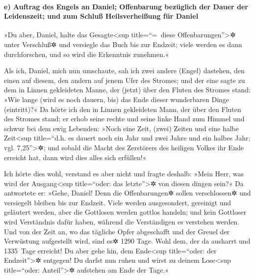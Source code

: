 \hypertarget{e-auftrag-des-engels-an-daniel-offenbarung-bezuxfcglich-der-dauer-der-leidenszeit-und-zum-schluuxdf-heilsverheiuxdfung-fuxfcr-daniel}{%
\paragraph{e) Auftrag des Engels an Daniel; Offenbarung bezüglich der
Dauer der Leidenszeit; und zum Schluß Heilsverheißung für
Daniel}\label{e-auftrag-des-engels-an-daniel-offenbarung-bezuxfcglich-der-dauer-der-leidenszeit-und-zum-schluuxdf-heilsverheiuxdfung-fuxfcr-daniel}}

»Du aber, Daniel, halte das Gesagte\textless sup
title=``=~diese Offenbarungen''\textgreater✲ unter Verschluß✲ und
versiegle das Buch bis zur Endzeit; viele werden es dann durchforschen,
und so wird die Erkenntnis zunehmen.«

Als ich, Daniel, mich nun umschaute, sah ich zwei andere
(Engel) dastehen, den einen auf diesem, den andern auf jenem Ufer des
Stromes; und der eine sagte zu dem in Linnen gekleideten
Manne, der (jetzt) über den Fluten des Stromes stand: »Wie lange (wird
es noch dauern, bis) das Ende dieser wunderbaren Dinge (eintritt)?«
Da hörte ich den in Linnen gekleideten Mann, der über den
Fluten des Stromes stand; er erhob seine rechte und seine linke Hand zum
Himmel und schwur bei dem ewig Lebenden: »Noch eine Zeit, (zwei) Zeiten
und eine halbe Zeit\textless sup title=``d.h. es dauert noch ein Jahr
und zwei Jahre und ein halbes Jahr; vgl. 7,25''\textgreater✲; und sobald
die Macht des Zerstörers des heiligen Volkes ihr Ende erreicht hat, dann
wird dies alles sich erfüllen!«

Ich hörte dies wohl, verstand es aber nicht und fragte
deshalb: »Mein Herr, was wird der Ausgang\textless sup title=``oder: das
letzte''\textgreater✲ von diesen dingen sein?« Da
antwortete er: »Gehe, Daniel! Denn die Offenbarungen✲ sollen
verschlossen✲ und versiegelt bleiben bis zur Endzeit.
Viele werden ausgesondert, gereinigt und geläutert
werden, aber die Gottlosen werden gottlos handeln; und kein Gottloser
wird Verständnis dafür haben, während die Verständigen es verstehen
werden. Und von der Zeit an, wo das tägliche Opfer
abgeschafft und der Greuel der Verwüstung aufgestellt wird, sind es✲
1290 Tage. Wohl dem, der da ausharrt und 1335~Tage
erreicht! Du aber gehe hin, dem Ende\textless sup
title=``oder: der Endzeit''\textgreater✲ entgegen! Du darfst nun ruhen
und wirst zu deinem Lose\textless sup title=``oder:
Anteil''\textgreater✲ aufstehen am Ende der Tage.«

